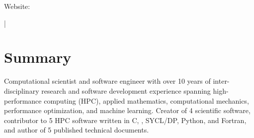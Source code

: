 \documentclass[letterpaper,10pt]{article}
\begin{document}
{\scshape\huge\Author}\vspace{2pt}

\begin{small}
  Website: \href{\AuthorWebsiteLink}{\AuthorWebsiteText}

  \vspace{2pt}\AuthorAddress

  \vspace{1pt}\href{mailto:\AuthorEmail}{\AuthorEmail} |
  \href{\AuthorPhoneLink}{\AuthorPhoneText}
\end{small}

\section{Summary}
Computational scientist and software engineer with over 10 years of
inter-disciplinary research and software development experience spanning
high-performance computing (HPC), applied mathematics, computational
mechanics, performance optimization, and machine learning. Creator of 4
scientific software, contributor to 5 HPC software written in C, \CC{},
SYCL/DP\CC{}, Python, and Fortran, and author of 5 published technical
documents.

\vspace{-182.8pt}
\end{document}
